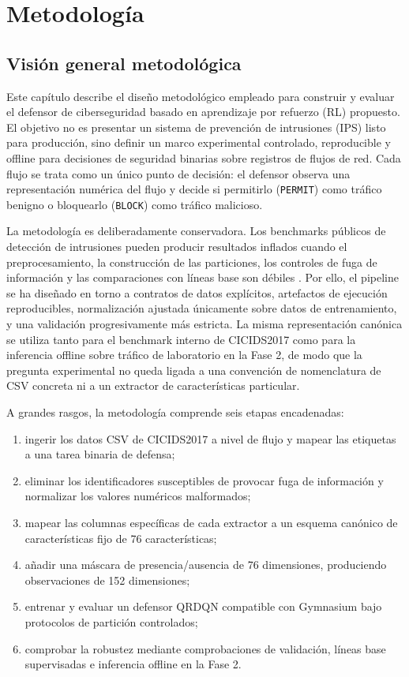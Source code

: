 \chapter{Metodología}

\section{Visión general metodológica}
Este capítulo describe el diseño metodológico empleado para construir y evaluar el defensor de ciberseguridad basado en aprendizaje por refuerzo (RL) propuesto. El objetivo no es presentar un sistema de prevención de intrusiones (IPS) listo para producción, sino definir un marco experimental controlado, reproducible y offline para decisiones de seguridad binarias sobre registros de flujos de red. Cada flujo se trata como un único punto de decisión: el defensor observa una representación numérica del flujo y decide si permitirlo (\texttt{PERMIT}) como tráfico benigno o bloquearlo (\texttt{BLOCK}) como tráfico malicioso.

La metodología es deliberadamente conservadora. Los benchmarks públicos de detección de intrusiones pueden producir resultados inflados cuando el preprocesamiento, la construcción de las particiones, los controles de fuga de información y las comparaciones con líneas base son débiles \parencite{Arp2020DosDontsMLSecurity,Engelen2021CICIDSIssues,Lanvin2023Errors}. Por ello, el pipeline se ha diseñado en torno a contratos de datos explícitos, artefactos de ejecución reproducibles, normalización ajustada únicamente sobre datos de entrenamiento, y una validación progresivamente más estricta. La misma representación canónica se utiliza tanto para el benchmark interno de CICIDS2017 como para la inferencia offline sobre tráfico de laboratorio en la Fase 2, de modo que la pregunta experimental no queda ligada a una convención de nomenclatura de CSV concreta ni a un extractor de características particular.

A grandes rasgos, la metodología comprende seis etapas encadenadas:
\begin{enumerate}
    \item ingerir los datos CSV de CICIDS2017 a nivel de flujo y mapear las etiquetas a una tarea binaria de defensa;
    \item eliminar los identificadores susceptibles de provocar fuga de información y normalizar los valores numéricos malformados;
    \item mapear las columnas específicas de cada extractor a un esquema canónico de características fijo de 76 características;
    \item añadir una máscara de presencia/ausencia de 76 dimensiones, produciendo observaciones de 152 dimensiones;
    \item entrenar y evaluar un defensor QRDQN compatible con Gymnasium bajo protocolos de partición controlados;
    \item comprobar la robustez mediante comprobaciones de validación, líneas base supervisadas e inferencia offline en la Fase 2.
\end{enumerate}


